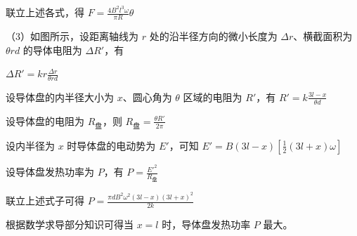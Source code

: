 \documentclass[\gkver]{gaokaozhenti}
\begin{document}
\begin{enumerate}
{联立上述各式，得
$F = \frac{4B^{2}l^{3}\omega}{\pi R}\theta$

（3）如图所示，设距离轴线为 $r$ 处的沿半径方向的微小长度为 $\Delta r$、横截面积为 $\theta rd$ 的导体电阻为 $\Delta R'$，有


$\Delta R' = kr\frac{\Delta r}{\theta rd}$

设导体盘的内半径大小为 $x$、圆心角为 $\theta$ 区域的电阻为 $R'$，有
$R' = k\frac{3l - x}{\theta d}$

设导体盘的电阻为 $R_{\text{盘}}$，则
$R_{\text{盘}} = \frac{\theta R'}{2\pi}$

设内半径为 $x$ 时导体盘的电动势为 $E'$，可知
$E' = B(3l - x)\left[\frac{1}{2}(3l + x)\omega\right]$

设导体盘发热功率为 $P$，有
$P = \frac{E'^{2}}{R_{\text{盘}}}$

联立上述式子可得
$P = \frac{\pi dB^{2}\omega^{2}(3l - x)(3l + x)^{2}}{2k}$

根据数学求导部分知识可得当 $x = l$ 时，导体盘发热功率 $P$ 最大。
}

\end{enumerate}
\end{document}
